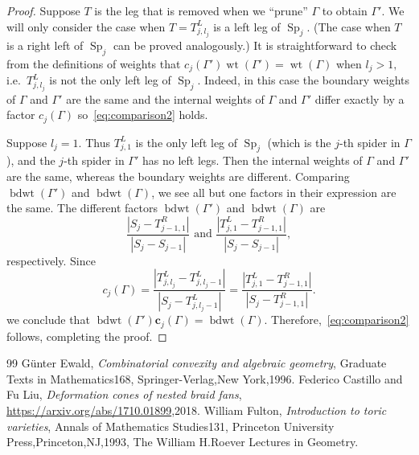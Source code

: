 \documentclass[10pt,a4paper]{amsart}
\newcommand{\ie}{i.e.\ }
\theoremstyle{definition}
\newcommand{\bm}[1]{{\boldsymbol{#1}}}
\renewcommand\c{\bm{c}}
\DeclareMathOperator{\wt}{wt}
\DeclareMathOperator{\bdwt}{bdwt}
\DeclareMathOperator{\Sp}{Sp}
\newcommand{\D}{{\Gamma}}
\begin{document}
\begin{proof}
	Suppose $T$ is the leg that is removed when we ``prune'' $\D$ to obtain $\D'.$ We will only consider the case when $T= T^L_{j,l_j}$ is a left leg of $\Sp_j.$ (The case when $T$ is a right left of $\Sp_j$ can be proved analogously.) 
	It is straightforward to check from the definitions of weights that $c_j(\D')\wt(\D')=\wt(\D)$ when $l_j >1,$ \ie $T^L_{j,l_j}$ is not the only left leg of $\Sp_j$. Indeed, in this case the boundary weights of $\D$ and $\D'$ are the same and the internal weights of $\D$ and $\D'$ differ exactly by a factor $c_j(\D)$ so~\eqref{eq:comparison2} holds. 
	
	Suppose $l_j=1.$ Thus $T^L_{j,1}$ is the only left leg of $\Sp_j$ (which is the $j$-th spider in $\D$), and the $j$-th spider in $\D'$ has no left legs. Then the internal weights of $\D$ and $\D'$ are the same, whereas the boundary weights are different. Comparing $\bdwt(\D')$ and $\bdwt(\D)$, we see all but one factors in their expression are the same. The different factors $\bdwt(\D')$ and $\bdwt(\D)$ are
	\[ \dfrac{|S_j-T^R_{j-1,1}|}{|S_j-S_{j-1}|} \text{ and } \frac{|T^L_{j,1}-T^R_{j-1,1}|}{|S_j-S_{j-1}|},\]
	respectively.
	Since
	\[ c_j(\Gamma) =\dfrac{|T^L_{j,l_j}-T^L_{j,l_j-1}|}{|S_j-T^L_{j,l_j-1}|} 
	= \dfrac{|T^L_{j,1}-T^R_{j-1,1}|}{|S_j-T^R_{j-1,1}|}.\]
	we conclude that $\bdwt(\D') \c_j(\D) =\bdwt(\D)$. Therefore,~\eqref{eq:comparison2} follows, completing the proof.
\end{proof}

\begin{thebibliography}{99}
 G\"unter Ewald, \emph{Combinatorial convexity and algebraic geometry}, Graduate Texts in Mathematics168, Springer-Verlag,New York,1996.
 Federico Castillo and Fu Liu, \emph{Deformation cones of nested braid fans}, \url{https://arxiv.org/abs/1710.01899},2018.
 William Fulton, \emph{Introduction to toric varieties}, Annals of Mathematics Studies131, Princeton University Press,Princeton,NJ,1993, The William H.Roever Lectures in Geometry.
\end{thebibliography}
\end{document}
